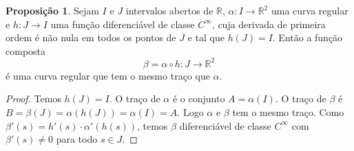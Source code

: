 \documentclass[12pt,leqno,twoside]{amsart}
\theoremstyle{definition}
\newtheorem{proposicao}{Proposição}[section]
\begin{document}
\begin{comment}
		Supondo $\pdv{f}{y}(x_0,y_0) > 0$. Como $\pdv{f}{y}(x_0,y_0)$ é contínua, existe uma bola $B_{d}(x_0,y_0)$ tal que $(x,y) \in B_{d}(x_0,y_0) \implies \pdv{f}{y}(x,y)> 0$. Logo existem $\delta> 0$ e $\varepsilon>0$ tal que pondo $I = (x_0-\delta, x_0+\delta)$ e $J = (y_0-\varepsilon, y_0+\varepsilon)$, o retângulo $ U  = (I\times J) $ estará contido em $ B_{d}(x_0, y_0)$. Logo fixando $x\in I$, a função $y\mapsto f(x,y)$ é crescente em $\overline{J}$ (fecho de $J$). Como $f(x_0,y_0) = c$, temos $f(x_0, y_0 -\varepsilon) < c $ e $f(x_0, y_0 +\varepsilon) > c$. Como $f$ é contínua, temos que existem retângulos $U_1 = I_1\times J_1$ e $U_2 = I_2\times J_2$ tal que $(x,y) \in U_1 \implies f(x,y) < c$ e  $(x,y) \in U_2 \implies f(x,y) > c$ . Tomando $I' = I_1 \cap I_2$, temos $x\in I' \implies f(x,y_0-\varepsilon) <c \land f(x,y_0+\varepsilon)>c$. Definindo $g:\overline{J}\to \mathbb{R}$ como $y\mapsto f(x, y)$, com $x \in I'$.  Temos $g(y_0 -\varepsilon)<c$ e $g(y_0 +\varepsilon)>c$, logo pelo Teorema do Valor Intermediário existe um único $\xi(x) \in J$ tal que $\xi(x) = f(x,\xi(x)) = c$ para todo $x\in I'$.  Temos portanto a função $\xi:I'\to J$ tal que para todo $x\in I' $, temos $f(x, \xi(x)) = c$. Se $k =\xi(x+h) - \xi(x)$, temos $k +\xi(x) = \xi(x+h)$, logo $f(x+h, \xi(x+h)) = f(x+h, k+\xi(x)) = f(x, \xi(x)) =  c.$ Temos pelo Teorema do Valor Médio que existe um $\theta \in (0,1)$ tal que $ 0= f(x + h, \phi(x)+k) - f(x,\phi(x)) = df_{\gamma(\theta)}(h, k)$, com $\gamma(t) =(x+ht, \phi(x) + kt)$ para $t\in [0,1]$. Lembrando que $df_{p}(w) = \left(\pdv{f}{x}(p) , \pdv{f}{y}(p) \right) \cdot w$. Logo temos $0 = df_{\gamma(\theta)}(h,k) = \left(\pdv{f}{x}(x+ \theta h , \xi(x) + \theta k) , \pdv{f}{y}(x+\theta h , \xi(x) + \theta k) \right)\cdot (h,k) = \pdv{f}{x}( x+\theta h, \xi(x) +\theta k)\cdot h+ \pdv{f}{y}( x+\theta h, \xi(x) +\theta k)\cdot k $. Logo $$\dfrac{\xi(x+h) - \xi(x)}{h} = \dfrac{k}{h} = \dfrac{ \pdv{f}{x}( x+\theta h, \xi(x) +\theta k)}{ \pdv{f}{y}( x+\theta h, \xi(x) +\theta k)}$$
	\end{proof}
\end{comment}


\vspace{0.2cm}

\begin{proposicao}
	Sejam $I$ e $J$ intervalos abertos de $\mathbb{R}$, $\alpha:I\to \mathbb{R}^2$ uma curva regular e $h:J\to I$ uma função diferenciável de classe $C^{\infty}$, cuja derivada de primeira ordem é não nula em todos os pontos de $J$ e tal que $h(J) = I$. Então a função composta $$\beta = \alpha \circ h: J \to \mathbb{R}^2$$ é uma curva regular que tem o mesmo traço que $\alpha$.
\end{proposicao}
\begin{proof}
	Temos $h(J) = I$. O traço de $\alpha$ é o conjunto $A = \alpha(I)$. O traço de $\beta$ é $B =\beta(J) = \alpha(h(J)) = \alpha(I) = A$. Logo $\alpha$ e $\beta$ tem o mesmo traço. Como $\beta'(s) = h'(s) \cdot \alpha'( h(s))$, temos $\beta$ diferenciável de classe $C^{\infty}$ com $\beta'(s) \neq 0$ para todo $s\in J$.
\end{proof}
\end{document}
